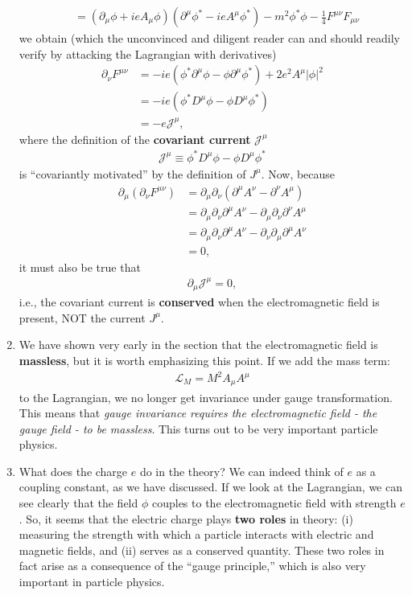 \documentclass[a4paper,11pt]{article}
\numberwithin{equation}{section}
\theoremstyle{definition}
\newcommand{\p}{\partial}
\newcommand{\lag}{\mathcal{L}}
\begin{document}
\begin{enumerate}
\begin{align}
	&= (\p_\mu\phi + ieA_\mu\phi)(\p^\mu\phi^* - ieA^\mu\phi^*) - m^2\phi^*\phi - \frac{1}{4}F^{\mu\nu}F_{\mu\nu}
	\end{align}
	we obtain (which the unconvinced and diligent reader can and should readily verify by attacking the Lagrangian with derivatives)
	\begin{align}
	\p_\nu F^{\mu\nu} &= -ie(\phi^*\p^\mu\phi - \phi\p^\mu\phi^*) + 2e^2A^\mu\vert \phi\vert^2\\
	&= -ie(\phi^* D^\mu\phi - \phi D^\mu\phi^*)\\
	&= -e\mathcal{J}^\mu,
	\end{align}
	where the definition of the \textbf{covariant current} $\mathcal{J}^\mu$
	\begin{align}
	\mathcal{J}^\mu \equiv \phi^* D^\mu\phi - \phi D^\mu\phi^*
	\end{align} is ``covariantly motivated'' by the definition of $J^\mu$. Now, because
	\begin{align}
	\p_\mu (\p_\nu F^{\mu\nu}) &= \p_\mu\p_\nu (\p^\mu A^\nu - \p^\nu A^\mu)\\
	&= \p_\mu\p_\nu\p^\mu A^\nu - \p_\mu\p_\nu\p^\nu A^\mu\\
	&= \p_\mu\p_\nu\p^\mu A^\nu - \p_\nu\p_\mu\p^\mu A^\nu\\
	&= 0,
	\end{align}
	it must also be true that
	\begin{align}
	\p_\mu \mathcal{J}^\mu = 0,
	\end{align}
	i.e., the covariant current is \textbf{conserved} when the electromagnetic field is present, NOT the current $J^\mu$.
	\item We have shown very early in the section that the electromagnetic field is \textbf{massless}, but it is worth emphasizing this point. If we add the mass term:
	\begin{align}
	\lag_M = M^2A_\mu A^\mu
	\end{align}
	to the Lagrangian, we no longer get invariance under gauge transformation. This means that \textit{gauge invariance requires the electromagnetic field - the gauge field - to be massless}. This turns out to be very important particle physics. 
	\item What does the charge $e$ do in the theory? We can indeed think of $e$ as a coupling constant, as we have discussed. If we look at the Lagrangian, we can see clearly that the field $\phi$ couples to the electromagnetic field with strength $e$. So, it seems that the electric charge plays \textbf{two roles} in theory: (i) measuring the strength with which a particle interacts with electric and magnetic fields, and (ii) serves as a conserved quantity. These two roles in fact arise as a consequence of the ``gauge principle,'' which is also very important in particle physics. 
\end{enumerate}
\end{document}
